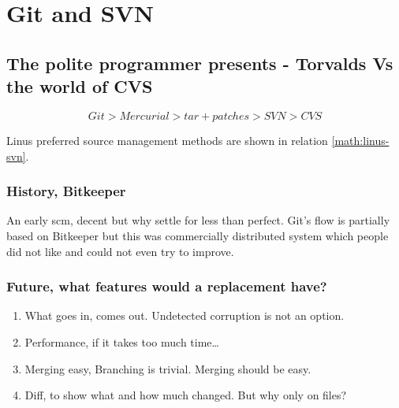 
\section{Git and SVN}

\subsection{The polite programmer presents - Torvalds Vs the world of CVS}

\[
Git >  Mercurial > tar+patches > SVN > CVS
\label{math:linus-svn}
\]

Linus preferred source management methods are shown in relation \ref{math:linus-svn}.


\subsubsection{History, Bitkeeper}
An early scm, decent but why settle for less than perfect.
Git's flow is partially based on Bitkeeper but this was commercially distributed system which people did not like and could not even try to improve.

\subsubsection{Future, what features would a replacement have?}

\begin{enumerate}
\item What goes in, comes out. Undetected corruption is not an option.
\item Performance, if it takes too much time\ldots
\item Merging easy, Branching is trivial. Merging should be easy.
\item Diff, to show what and how much changed. But why only on files?
\end{enumerate}

